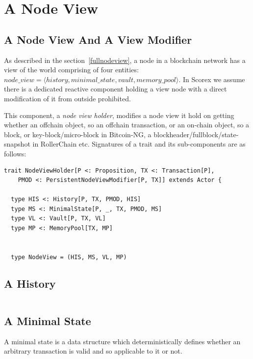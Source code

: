 \documentclass[]{report}   %
\begin{document}
\section{A Node View}

\subsection{A Node View And A View Modifier}

As described in the section~\ref{fullnodeview}, a node in a blockchain network has a view of the world comprising of four entities:
\(node\_view = \langle history, minimal\_state, vault, memory\_pool \rangle \). In Scorex we assume there is a dedicated reactive component holding a view node with a direct modification of it from outside prohibited.

This component, a \textit{node view holder}, modifies a node view it hold on getting whether an offchain object, so an offchain transaction, or an on-chain object, so a block, or key-block/micro-block in Bitcoin-NG, a blockheader/fullblock/state-snapshot in RollerChain etc. Signatures of a trait and its sub-components are as follows:

\begin{lstlisting}
trait NodeViewHolder[P <: Proposition, TX <: Transaction[P],
	PMOD <: PersistentNodeViewModifier[P, TX]] extends Actor {

  type HIS <: History[P, TX, PMOD, HIS]
  type MS <: MinimalState[P, _, TX, PMOD, MS]
  type VL <: Vault[P, TX, VL]
  type MP <: MemoryPool[TX, MP]


  type NodeView = (HIS, MS, VL, MP)
\end{lstlisting}

\subsection{A History}

\begin{lstlisting}
\end{lstlisting}

\subsection{A Minimal State}

A minimal state is a data structure which deterministically defines whether an arbitrary transaction is valid and so
applicable to it or not.

\begin{lstlisting}
\end{lstlisting}
\end{document}
